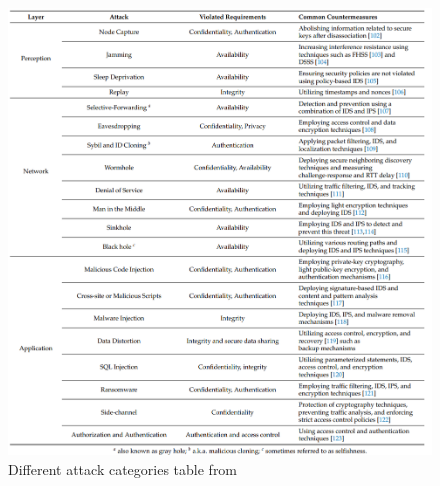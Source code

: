 \documentclass[article,a4paper]{IEEEtran}
\begin{document}
\begin{figure}
    \includegraphics[width=\columnwidth]{Attackcategori.png}
    \caption{ Different attack categories table from \cite{SurveySecurity} }
    \label{fig2: Attackcategories }
\end{figure}
\end{document}
